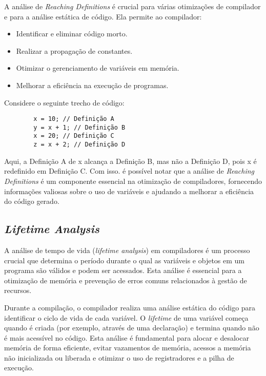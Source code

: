 \documentclass{article}
\begin{document}
    A análise de \textit{Reaching Definitions} é crucial para várias otimizações de compilador e para a
    análise estática de código. Ela permite ao compilador:

    \begin{itemize}
        \item Identificar e eliminar código morto.
        \item Realizar a propagação de constantes.
        \item Otimizar o gerenciamento de variáveis em memória.
        \item Melhorar a eficiência na execução de programas.
    \end{itemize}

    Considere o seguinte trecho de código:

    \begin{verbatim}
        x = 10; // Definição A
        y = x + 1; // Definição B
        x = 20; // Definição C
        z = x + 2; // Definição D
    \end{verbatim}

    Aqui, a {Definição A} de {x} alcança a {Definição B}, mas não a {Definição D},
    pois {x} é redefinido em {Definição C}. Com isso. é possível notar que a análise de
    \textit{Reaching Definitions} é um componente essencial na otimização de compiladores,
    fornecendo informações valiosas sobre o uso de variáveis e ajudando a melhorar a
    eficiência do código gerado.

    \subsection*{\emph{Lifetime Analysis}}

    A análise de tempo de vida (\textit{lifetime analysis}) em compiladores é um processo crucial que determina o
    período durante o qual as variáveis e objetos em um programa são válidos e podem ser acessados. Esta análise é
    essencial para a otimização de memória e prevenção de erros comuns relacionados à gestão de recursos.

    Durante a compilação, o compilador realiza uma análise estática do código para identificar o ciclo de vida
    de cada variável. O \textit{lifetime} de uma variável começa quando é criada (por exemplo, através de uma declaração)
    e termina quando não é mais acessível no código. Esta análise é fundamental para
    alocar e desalocar memória de forma eficiente, evitar vazamentos de memória, acessos a memória não
    inicializada ou liberada e otimizar o uso de registradores e a pilha de execução.
\end{document}
